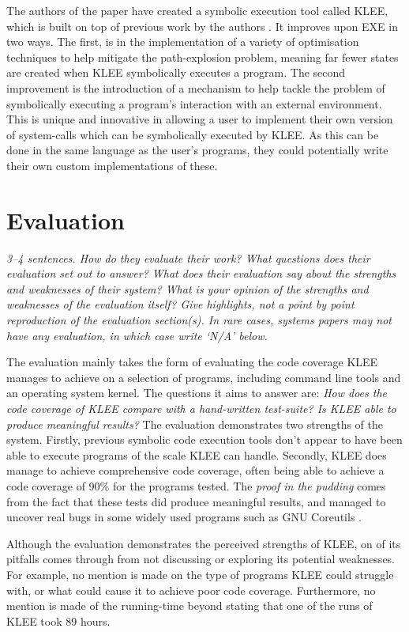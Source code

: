 \documentclass[11pt]{article}
\begin{document}
The authors of the paper have created a symbolic execution tool called KLEE,
which is built on top of previous work by the authors \cite{EXE}. It improves
upon EXE in two ways. The first, is in the implementation of a variety of
optimisation techniques to help mitigate the path-explosion problem, meaning
far fewer states are created when KLEE symbolically executes a program. The
second improvement is the introduction of a mechanism to help tackle the
problem of symbolically executing a program's interaction with an external
environment. This is unique and innovative in allowing a user to implement
their own version of system-calls which can be symbolically executed by KLEE.
As this can be done in the same language as the user's programs, they could
potentially write their own custom implementations of these.

\section*{Evaluation}

\textsl{3--4 sentences. How do they evaluate their work? What questions does
their evaluation set out to answer? What does their evaluation say about the
strengths and weaknesses of their system? What is your opinion of the strengths
and weaknesses of the evaluation itself? Give highlights, not a point by point
reproduction of the evaluation section(s). In rare cases, systems papers may
not have any evaluation, in which case write `N/A' below.}

The evaluation mainly takes the form of evaluating the code coverage KLEE
manages to achieve on a selection of programs, including command line tools and
an operating system kernel. The questions it aims to answer are: \textit{How
does the code coverage of KLEE compare with a hand-written test-suite? Is KLEE
able to produce meaningful results?} The evaluation demonstrates two strengths
of the system. Firstly, previous symbolic code execution tools don't appear to
have been able to execute programs of the scale KLEE can handle. Secondly, KLEE
does manage to achieve comprehensive code coverage, often being able to achieve
a code coverage of 90\% for the programs tested. The \textit{proof in the
pudding} comes from the fact that these tests did produce meaningful results,
and managed to uncover real bugs in some widely used programs such as GNU
Coreutils \cite{Coreutils}.

Although the evaluation demonstrates the perceived strengths of KLEE, on of its
pitfalls comes through from not discussing or exploring its potential
weaknesses. For example, no mention is made on the type of programs KLEE could
struggle with, or what could cause it to achieve poor code coverage.
Furthermore, no mention is made of the running-time beyond stating that one of
the runs of KLEE took 89 hours.
\end{document}
